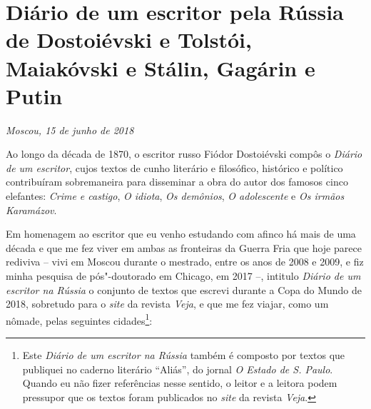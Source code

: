 \movetooddpage
\chapter*{Diário de um escritor pela Rússia de Dostoiévski e Tolstói, Maiakóvski e Stálin, Gagárin e Putin}
\@openrighttrue\makeatother

\begin{flushright}
\emph{Moscou, 15 de junho de 2018}
\end{flushright}

Ao longo da década de 1870, o escritor russo Fiódor Dostoiévski compôs o
\emph{Diário de um escritor}, cujos textos de cunho literário e
filosófico, histórico e político contribuíram sobremaneira para
disseminar a obra do autor dos famosos cinco elefantes: \emph{Crime e
castigo}, \emph{O idiota}, \emph{Os demônios}, \emph{O adolescente} e
\emph{Os irmãos Karamázov}.

Em homenagem ao escritor que eu venho estudando com afinco há mais de
uma década e que me fez viver em ambas as fronteiras da Guerra Fria que
hoje parece rediviva -- vivi em Moscou durante o mestrado, entre os anos
de 2008 e 2009, e fiz minha pesquisa de pós"-doutorado em Chicago, em
2017 --, intitulo \emph{Diário de um escritor na Rússia} o conjunto de
textos que escrevi durante a Copa do Mundo de 2018, sobretudo para o
\emph{site} da revista \emph{Veja}, e que me fez viajar, como um nômade,
pelas seguintes cidades\footnote{Este \emph{Diário de um escritor na
  Rússia} também é composto por textos que publiquei no caderno
  literário ``Aliás'', do jornal \emph{O Estado de S. Paulo}. Quando eu
  não fizer referências nesse sentido, o leitor e a leitora podem
  pressupor que os textos foram publicados no \emph{site} da revista
  \emph{Veja}.}:

